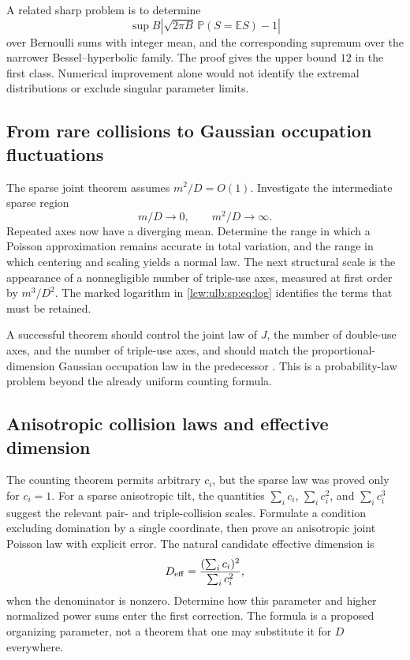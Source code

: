 \documentclass[11pt,letterpaper]{article}
\theoremstyle{remark}\newtheorem{remark}[theorem]{Remark}
\newcommand{\E}{\mathbb E}\newcommand{\Pp}{\mathbb P}
\newcommand{\Prob}{\mathbb P}
\begin{document}
A related sharp problem is to determine
\[
 \sup B\left|\sqrt{2\pi B}\,\Prob(S=\E S)-1\right|
\]
over Bernoulli sums with integer mean, and the corresponding supremum
over the narrower Bessel--hyperbolic family. The proof gives the upper
bound $12$ in the first class. Numerical improvement alone would not
identify the extremal distributions or exclude singular parameter
limits.

\subsection{From rare collisions to Gaussian occupation fluctuations}

The sparse joint theorem assumes $m^2/D=O(1)$. Investigate the
intermediate sparse region
\[
 m/D\to0,\qquad m^2/D\to\infty.
\]
Repeated axes now have a diverging mean. Determine the range in which
a Poisson approximation remains accurate in total variation, and
the range in which centering and scaling yields a normal law. The
next structural scale is the appearance of a nonnegligible number
of triple-use axes, measured at first order by $m^3/D^2$.
The marked logarithm in \eqref{lcw:ulb:sp:eq:log} identifies the terms
that must be retained.

A successful theorem should control the joint law of $J$, the number
of double-use axes, and the number of triple-use axes, and should
match the proportional-dimension Gaussian occupation law in the
predecessor \cite{lcw}. This is a probability-law problem beyond the
already uniform counting formula.

\subsection{Anisotropic collision laws and effective dimension}

The counting theorem permits arbitrary $c_i$, but the sparse law was
proved only for $c_i=1$. For a sparse anisotropic tilt, the quantities
$\sum_i c_i$, $\sum_i c_i^2$, and $\sum_i c_i^3$ suggest the relevant
pair- and triple-collision scales. Formulate a condition excluding
domination by a single coordinate, then prove an anisotropic joint
Poisson law with explicit error. The natural candidate effective
dimension is
\[
 D_{\rm eff}=\frac{(\sum_i c_i)^2}{\sum_i c_i^2},
\]
when the denominator is nonzero. Determine how this parameter and
higher normalized power sums enter the first correction. The formula
is a proposed organizing parameter, not a theorem that one may
substitute it for $D$ everywhere.
\end{document}
